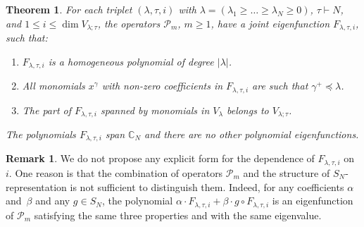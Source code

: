 \documentclass[11pt]{article}
\newtheorem{theorem}[theo]{Theorem}
\theoremstyle{definition}
\newtheorem{rema}[theo]{Remark}
\numberwithin{equation}{section}
\newcommand{\PP}{\mathcal P}
\begin{document}
\begin{theorem}\label{Theorem_classification_of_ef}
 For each triplet $(\lambda,\tau,i)$ with $\lambda=(\lambda_1\ge \dots\ge \lambda_N\ge 0)$, $\tau\vdash N$, and $1\le i \le \dim V_{\lambda;\tau}$, the operators $\PP_m$, $m\ge 1$, have a joint eigenfunction $F_{\lambda,\tau,i}$, such that:
 \begin{enumerate}
  \item $F_{\lambda,\tau,i}$ is a homogeneous polynomial of degree $|\lambda|$.
  \item All monomials $x^{\gamma}$ with non-zero coefficients in $F_{\lambda,\tau,i}$ are such that $\gamma^+\preceq \lambda$.
  \item The part of $F_{\lambda,\tau,i}$ spanned by monomials in $V_\lambda$ belongs to $V_{\lambda;\tau}$.
 \end{enumerate}
 The polynomials $F_{\lambda,\tau,i}$ span $\mathbb C_N$ and there are no other polynomial eigenfunctions.
\end{theorem}
\begin{rema}
 We do not propose any explicit form for the dependence of $F_{\lambda,\tau,i}$ on~$i$. One reason is that the combination of operators $\PP_m$ and the structure of $S_N$-representation is not sufficient to distinguish them. Indeed, for any coefficients $\alpha$ and~$\beta$ and any $g\in S_N$, the polynomial $\alpha \cdot F_{\lambda,\tau,i} +\beta \cdot g \circ F_{\lambda,\tau,i}$ is an eigenfunction of $\PP_m$ satisfying the same three properties and with the same eigenvalue.
\end{rema}
\end{document}
